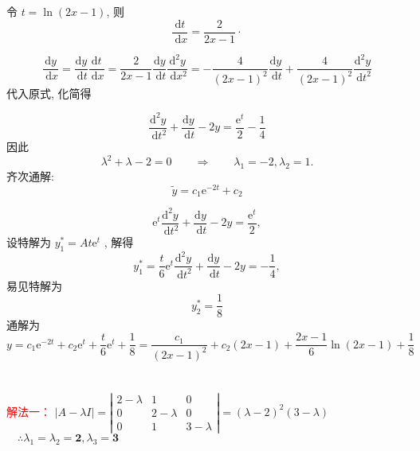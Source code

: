 
\section{}

令
 $t=\ln (2 x-1)$, 则  $$\frac{\mathrm{d} t}{\mathrm{~d} x}=\frac{2}{2 x-1} \cdot$$ 
 
$$ \frac{\mathrm{d} y}{\mathrm{~d} x}=\frac{\mathrm{d} y}{\mathrm{~d} t} \frac{\mathrm{d} t}{\mathrm{~d} x}=\frac{2}{2 x-1} \frac{\mathrm{d} y}{\mathrm{~d} t}   \frac{\mathrm{d}^{2} y}{\mathrm{~d} x^{2}}=-\frac{4}{(2 x-1)^{2}} \frac{\mathrm{d} y}{\mathrm{~d} t}+\frac{4}{(2 x-1)^{2}} \frac{\mathrm{d}^{2} y}{\mathrm{~d} t^{2}}$$  代入原式, 化简得

$$ \frac{\mathrm{d}^{2} y}{\mathrm{~d} t^{2}}+\frac{\mathrm{d} y}{\mathrm{~d} t}-2 y=\frac{\mathrm{e}^{t}}{2}-\frac{1}{4}$$ 因此$$\lambda^{2}+\lambda-2=0\qquad \Longrightarrow\qquad\lambda_{1}=-2, \lambda_{2}=1 .$$ 齐次通解: $$ \tilde{y}=c_{1} \mathrm{e}^{-2 t}+c_{2}$$ 

$$\mathrm{e}^{t}   \frac{\mathrm{d}^{2} y}{\mathrm{~d} t^{2}}+\frac{\mathrm{d} y}{\mathrm{~d} t}-2 y=\frac{\mathrm{e}^{t}}{2} ,$$设特解为  $y_{1}^{*}=A t \mathrm{e}^{t}$ , 解得  $$y_{1}^{*}=\frac{t}{6} \mathrm{e}^{t}   \frac{\mathrm{d}^{2} y}{\mathrm{~d} t^{2}}+\frac{\mathrm{d} y}{\mathrm{~d} t}-2 y=-\frac{1}{4} ,$$ 易见特解为  $$y_{2}^{*}=\frac{1}{8} $$
通解为  $$y=c_{1} \mathrm{e}^{-2 t}+c_{2} \mathrm{e}^{t}+\frac{t}{6} \mathrm{e}^{t}+\frac{1}{8}=\frac{c_{1}}{(2 x-1)^{2}}+c_{2}(2 x-1)+\frac{2 x-1}{6} \ln (2 x-1)+\frac{1}{8} $$


\section{}
\textcolor{red}{解法一：}
  $|A-\lambda I|=\left|\begin{array}{ccc}2-\lambda & 1 & 0 \\ 0 & 2-\lambda & 0 \\ 0 & 1 & 3-\lambda\end{array}\right|=(\lambda-2)^{2}(3-\lambda)$ 
$\quad \therefore \lambda_{1}=\lambda_{2}=\mathbf{2}, \lambda_{3}=\mathbf{3}$  

